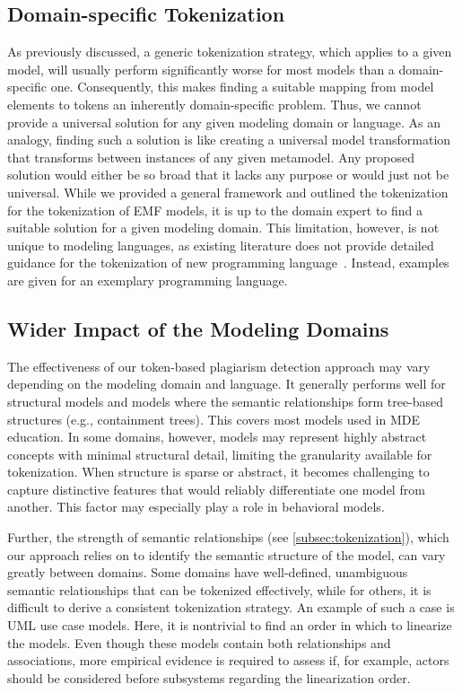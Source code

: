 \subsection*{Domain-specific Tokenization}
As previously discussed, a generic tokenization strategy, which applies to a given model, will usually perform significantly worse for most models than a domain-specific one. Consequently, this makes finding a suitable mapping from model elements to tokens an inherently domain-specific problem. Thus, we cannot provide a universal solution for any given modeling domain or language. As an analogy, finding such a solution is like creating a universal model transformation that transforms between instances of any given metamodel. Any proposed solution would either be so broad that it lacks any purpose or would just not be universal.
While we provided a general framework and outlined the tokenization for the tokenization of \ac{EMF} models, it is up to the domain expert to find a suitable solution for a given modeling domain.
This limitation, however, is not unique to modeling languages, as existing literature does not provide detailed guidance for the tokenization of new programming language~\cite{Maertens2022, prechelt2002, prechelt2000, Joy1999}. Instead, examples are given for an exemplary programming language.

\subsection*{Wider Impact of the Modeling Domains}\label{sec:mde-limit-domain}
The effectiveness of our token-based plagiarism detection approach may vary depending on the modeling domain and language. It generally performs well for structural models and models where the semantic relationships form tree-based structures (e.g., containment trees). This covers most models used in \ac{MDE} education.
In some domains, however, models may represent highly abstract concepts with minimal structural detail, limiting the granularity available for tokenization. When structure is sparse or abstract, it becomes challenging to capture distinctive features that would reliably differentiate one model from another. This factor may especially play a role in behavioral models.

Further, the strength of semantic relationships (see \autoref{subsec:tokenization}), which our approach relies on to identify the semantic structure of the model, can vary greatly between domains. Some domains have well-defined, unambiguous semantic relationships that can be tokenized effectively, while for others, it is difficult to derive a consistent tokenization strategy. An example of such a case is \ac{UML} use case models. Here, it is nontrivial to find an order in which to linearize the models. Even though these models contain both relationships and associations, more empirical evidence is required to assess if, for example, actors should be considered before subsystems regarding the linearization order.

